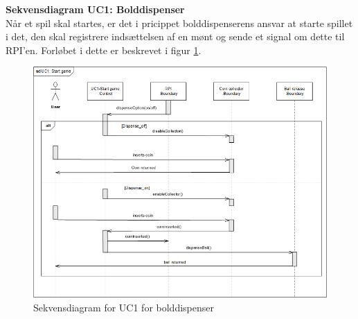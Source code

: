 \documentclass[Arkitektur/System_main.tex]{subfiles}
\begin{document}
\textbf{Sekvensdiagram UC1: Bolddispenser}\\
Når et spil skal startes, er det i pricippet bolddispenserens ansvar at starte spillet i det, den skal registrere indsættelsen af en mønt og sende et signal om dette til RPI'en. Forløbet i dette er beskrevet i figur \ref{fig:seq_uc1_balldispenser}.
\begin{figure}[H]
    \centering
    \includegraphics[width=\textwidth]{Arkitektur/Softwarearkitektur/Applikationsmodel/BallDispenser/graphicsBallDispenser/ApplikationsmodelBolddispensersequc1.png}
    \caption{Sekvensdiagram for UC1 for bolddispenser}
    \label{fig:seq_uc1_balldispenser}
\end{figure}
\newpage
\end{document}
